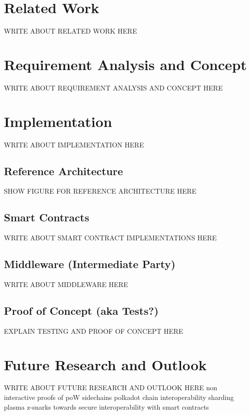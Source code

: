 \chapter{Related Work}
\label{ch:chapter03}
WRITE ABOUT RELATED WORK HERE


\chapter{Requirement Analysis and Concept}
\label{ch:chapter04}
WRITE ABOUT REQUIREMENT ANALYSIS AND CONCEPT HERE

\chapter{Implementation}
\label{ch:chapter05}
WRITE ABOUT IMPLEMENTATION HERE

\section{Reference Architecture}
\label{sec:chapter05:ref_architecture}

SHOW FIGURE FOR REFERENCE ARCHITECTURE HERE
%
%
\section{Smart Contracts}
\label{sec:chapter05:smartcontracts}
WRITE ABOUT SMART CONTRACT IMPLEMENTATIONS HERE

\section{Middleware (Intermediate Party)}
\label{sec:chapter05:middleware}
WRITE ABOUT MIDDLEWARE HERE

\section{Proof of Concept (aka Tests?)}
\label{sec:chapter05:poc}
EXPLAIN TESTING AND PROOF OF CONCEPT HERE

\chapter{Future Research and Outlook}
\label{ch:chapter06}
WRITE ABOUT FUTURE RESEARCH AND OUTLOOK HERE
non interactive proofs of poW \cite{kiayias2017non} sidechains \cite{kiayias2019proof} polkadot \cite{wood2016polkadot}  chain interoperability \cite{buterin2016chain} sharding \cite{buterin2017sharding} plasma \cite{poon2017plasma} z-snarks \cite{garoffolo2020zendoo} towards secure interoperability with smart contracts \cite{dagher2017towards}

